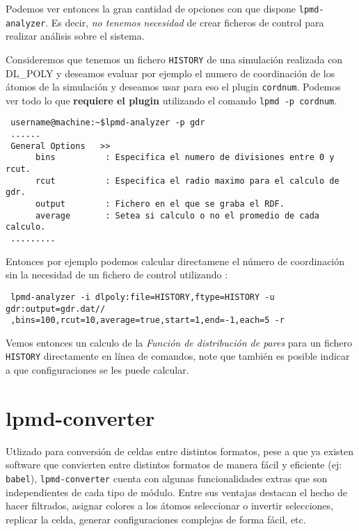 Podemos ver entonces la gran cantidad de opciones con que dispone \verb|lpmd-analyzer|. Es decir, \textit{no tenemos necesidad} de crear ficheros de control para realizar an\'alisis sobre el sistema.

Consideremos que tenemos un fichero \verb|HISTORY| de una simulaci\'on realizada con DL\_POLY y deseamos evaluar por ejemplo el numero de coordinaci\'on de los \'atomos de la simulaci\'on y deseamos usar para eso el plugin \verb|cordnum|. Podemos ver todo lo que \textbf{requiere el plugin} utilizando el comando \verb|lpmd -p cordnum|.

\begin{verbatim}
 username@machine:~$lpmd-analyzer -p gdr
 ......
 General Options   >>                                                          
      bins          : Especifica el numero de divisiones entre 0 y rcut.       
      rcut          : Especifica el radio maximo para el calculo de gdr.       
      output        : Fichero en el que se graba el RDF.                       
      average       : Setea si calculo o no el promedio de cada calculo.       
 .........
\end{verbatim}

Entonces por ejemplo podemos calcular directamene el n\'umero de coordinaci\'on sin la necesidad de un fichero de control utilizando :

\begin{verbatim}
 lpmd-analyzer -i dlpoly:file=HISTORY,ftype=HISTORY -u gdr:output=gdr.dat//
 ,bins=100,rcut=10,average=true,start=1,end=-1,each=5 -r
\end{verbatim}

Vemos entonces un calculo de la \textit{Funci\'on de distribuci\'on de pares} para un fichero \verb|HISTORY| directamente en l\'inea de comandos, note que tambi\'en es posible indicar a que configuraciones se les puede calcular.


\section{lpmd-converter}

Utlizado para conversi\'on de celdas entre distintos formatos, pese a que ya existen software que convierten entre distintos formatos de manera f\'acil y eficiente (ej: \verb|babel|), \verb|lpmd-converter| cuenta con algunas funcionalidades extras que son independientes de cada tipo de m\'odulo. Entre sus ventajas destacan el hecho de hacer filtrados, asignar colores a los \'atomos seleccionar o invertir selecciones, replicar la celda, generar configuraciones complejas de forma f\'acil, etc.

